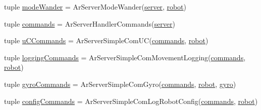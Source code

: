 \begin{DoxyCompactItemize}
\item 
tuple \hyperlink{namespaceservidor__novo_a1f0f40c9f2b17d9579e189b4ec8f4ffe}{modeWander} = ArServerModeWander(\hyperlink{namespaceservidor__novo_a538b68fbb948f9cf0573a119042c9e0d}{server}, \hyperlink{namespaceservidor__novo_ae604d92f7f5c43d2a993ae9402534424}{robot})
\item 
tuple \hyperlink{namespaceservidor__novo_a1cd792305e65be0c6e06c0cd885b1593}{commands} = ArServerHandlerCommands(\hyperlink{namespaceservidor__novo_a538b68fbb948f9cf0573a119042c9e0d}{server})
\item 
tuple \hyperlink{namespaceservidor__novo_a9cc0dcde8396c1ff04833e8811a1df74}{uCCommands} = ArServerSimpleComUC(\hyperlink{namespaceservidor__novo_a1cd792305e65be0c6e06c0cd885b1593}{commands}, \hyperlink{namespaceservidor__novo_ae604d92f7f5c43d2a993ae9402534424}{robot})
\item 
tuple \hyperlink{namespaceservidor__novo_a0407c97de55cf4fa7aac903f2813aa50}{loggingCommands} = ArServerSimpleComMovementLogging(\hyperlink{namespaceservidor__novo_a1cd792305e65be0c6e06c0cd885b1593}{commands}, \hyperlink{namespaceservidor__novo_ae604d92f7f5c43d2a993ae9402534424}{robot})
\item 
tuple \hyperlink{namespaceservidor__novo_a20fff7251fe63ba8161a62b254023d04}{gyroCommands} = ArServerSimpleComGyro(\hyperlink{namespaceservidor__novo_a1cd792305e65be0c6e06c0cd885b1593}{commands}, \hyperlink{namespaceservidor__novo_ae604d92f7f5c43d2a993ae9402534424}{robot}, \hyperlink{namespaceservidor__novo_a2b0e3a19479a3a456184ce1f64a648a0}{gyro})
\item 
tuple \hyperlink{namespaceservidor__novo_a0b77e4ad4ff622636ae781f9e76c0bba}{configCommands} = ArServerSimpleComLogRobotConfig(\hyperlink{namespaceservidor__novo_a1cd792305e65be0c6e06c0cd885b1593}{commands}, \hyperlink{namespaceservidor__novo_ae604d92f7f5c43d2a993ae9402534424}{robot})
\end{DoxyCompactItemize}


